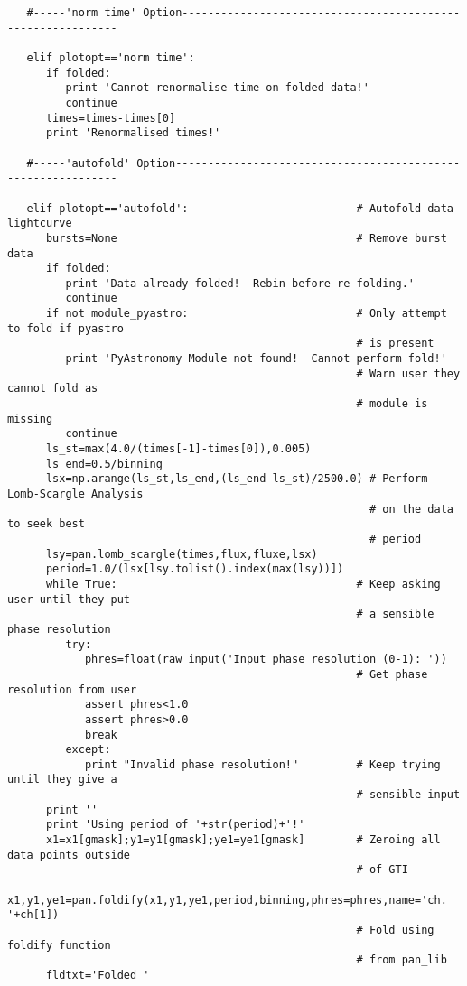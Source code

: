 \begin{verbatim}
   #-----'norm time' Option------------------------------------------------------------

   elif plotopt=='norm time':
      if folded:
         print 'Cannot renormalise time on folded data!'
         continue
      times=times-times[0]
      print 'Renormalised times!'

   #-----'autofold' Option-------------------------------------------------------------

   elif plotopt=='autofold':                          # Autofold data lightcurve
      bursts=None                                     # Remove burst data
      if folded:
         print 'Data already folded!  Rebin before re-folding.'
         continue
      if not module_pyastro:                          # Only attempt to fold if pyastro
                                                      # is present
         print 'PyAstronomy Module not found!  Cannot perform fold!'
                                                      # Warn user they cannot fold as
                                                      # module is missing
         continue
      ls_st=max(4.0/(times[-1]-times[0]),0.005)
      ls_end=0.5/binning
      lsx=np.arange(ls_st,ls_end,(ls_end-ls_st)/2500.0) # Perform Lomb-Scargle Analysis
                                                        # on the data to seek best
                                                        # period
      lsy=pan.lomb_scargle(times,flux,fluxe,lsx)
      period=1.0/(lsx[lsy.tolist().index(max(lsy))])
      while True:                                     # Keep asking user until they put
                                                      # a sensible phase resolution
         try:
            phres=float(raw_input('Input phase resolution (0-1): '))
                                                      # Get phase resolution from user
            assert phres<1.0
            assert phres>0.0
            break
         except:
            print "Invalid phase resolution!"         # Keep trying until they give a
                                                      # sensible input
      print ''
      print 'Using period of '+str(period)+'!'
      x1=x1[gmask];y1=y1[gmask];ye1=ye1[gmask]        # Zeroing all data points outside
                                                      # of GTI
      x1,y1,ye1=pan.foldify(x1,y1,ye1,period,binning,phres=phres,name='ch. '+ch[1])
                                                      # Fold using foldify function
                                                      # from pan_lib
      fldtxt='Folded '

\end{verbatim}

